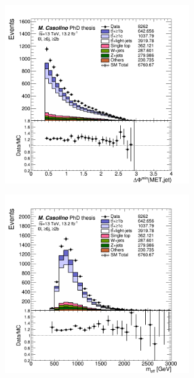 \begin{figure}[p]
\begin{subfigure}{0.33\textwidth}
  \caption{}
  \label{}
\end{subfigure}
\begin{subfigure}{0.33\textwidth}
  \centering
  \includegraphics[width=0.9\textwidth]{figures/VLQ/presel/0lep/canv_c0l2b_dPhi_jetmet.png}
  \caption{}
  \label{}
\end{subfigure}
\begin{subfigure}{0.33\textwidth}
  \centering
  \includegraphics[width=0.9\textwidth]{figures/VLQ/presel/0lep/canv_c0l2b_meff.png}

\end{subfigure}
\end{figure}
